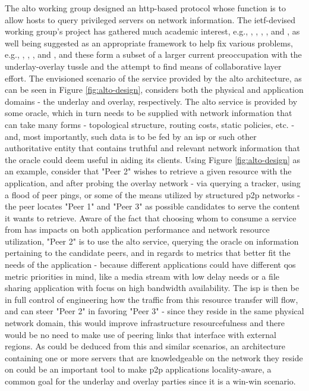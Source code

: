     The \gls{alto} \cite{alto-about} working group designed an \gls{http}-based protocol whose function is to allow hosts to query privileged servers on network information.
    The \gls{ietf}-devised working group's project has gathered much academic interest, e.g., \cite{seedorf2009}, \cite{pfa-10}, \cite{adaptable-overlay}, \cite{liao2014}, and \cite{dan-Commag10}, as well being suggested as an appropriate framework to help fix various problems, e.g., \cite{fps-12}, \cite{pfa-10}, \cite{wichtlhuber2017}, and \cite{cdni-problem-statement}, and these form a subset of a larger current preoccupation with the underlay-overlay tussle and the attempt to find means of collaborative layer effort.
    The envisioned scenario of the service provided by the \gls{alto} architecture, as can be seen in Figure \ref{fig:alto-design}, considers both the physical and application domains - the underlay and overlay, respectively.
    The \gls{alto} service is provided by some oracle, which in turn needs to be supplied with network information that can take many forms - topological structure, routing costs, static policies, etc. - and, most importantly, such data is to be fed by an \gls{isp} or such other authoritative entity that contains truthful and relevant network information that the oracle could deem useful in aiding its clients.
    Using Figure \ref{fig:alto-design} as an example, consider that "Peer 2" wishes to retrieve a given resource with the application, and after probing the overlay network - via querying a tracker, using a flood of peer pings, or some of the means utilized by structured \gls{p2p} networks - the peer locates "Peer 1" and "Peer 3" as possible candidates to serve the content it wants to retrieve.
    Aware of the fact that choosing whom to consume a service from has impacts on both application performance and network resource utilization, "Peer 2" is to use the \gls{alto} service, querying the oracle on information pertaining to the candidate peers, and in regards to metrics that better fit the needs of the application - because different applications could have different \gls{qos} metric priorities in mind, like a media stream with low delay needs or a file sharing application with focus on high bandwidth availability.
    The \gls{isp} is then be in full control of engineering how the traffic from this resource transfer will flow, and can steer "Peer 2" in favoring "Peer 3" - since they reside in the same physical network domain, this would improve infrastructure resourcefulness and there would be no need to make use of peering links that interface with external regions.
    As could be deduced from this and similar scenarios, an architecture containing one or more servers that are knowledgeable on the network they reside on could be an important tool to make \gls{p2p} applications locality-aware, a common goal for the underlay and overlay parties since it is a win-win scenario.

